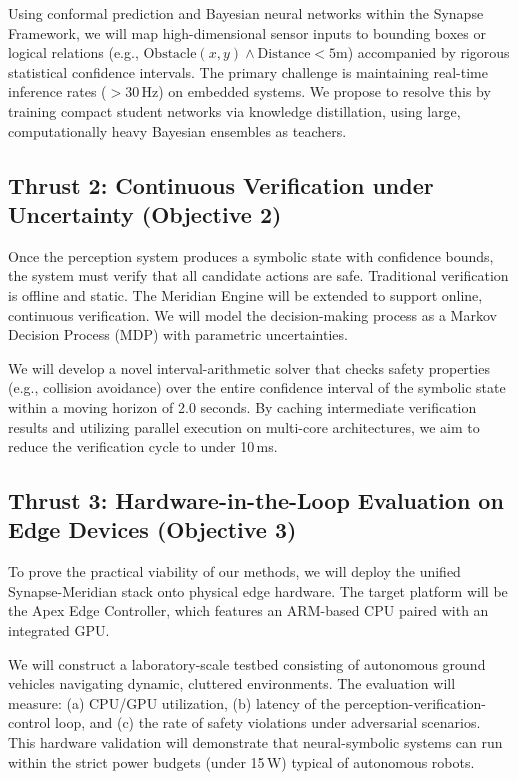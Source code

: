 \documentclass[12pt, letterpaper]{article}
\begin{document}
Using conformal prediction and Bayesian neural networks within the Synapse Framework, we will map high-dimensional sensor inputs to bounding boxes or logical relations (e.g., $\text{Obstacle}(x, y) \land \text{Distance} < 5\text{m}$) accompanied by rigorous statistical confidence intervals. The primary challenge is maintaining real-time inference rates ($>30$\,Hz) on embedded systems. We propose to resolve this by training compact student networks via knowledge distillation, using large, computationally heavy Bayesian ensembles as teachers.

\subsection{Thrust 2: Continuous Verification under Uncertainty (Objective 2)}
Once the perception system produces a symbolic state with confidence bounds, the system must verify that all candidate actions are safe. Traditional verification is offline and static. The Meridian Engine will be extended to support online, continuous verification. We will model the decision-making process as a Markov Decision Process (MDP) with parametric uncertainties. 

We will develop a novel interval-arithmetic solver that checks safety properties (e.g., collision avoidance) over the entire confidence interval of the symbolic state within a moving horizon of 2.0 seconds. By caching intermediate verification results and utilizing parallel execution on multi-core architectures, we aim to reduce the verification cycle to under 10\,ms.

\subsection{Thrust 3: Hardware-in-the-Loop Evaluation on Edge Devices (Objective 3)}
To prove the practical viability of our methods, we will deploy the unified Synapse-Meridian stack onto physical edge hardware. The target platform will be the Apex Edge Controller, which features an ARM-based CPU paired with an integrated GPU. 

We will construct a laboratory-scale testbed consisting of autonomous ground vehicles navigating dynamic, cluttered environments. The evaluation will measure: (a) CPU/GPU utilization, (b) latency of the perception-verification-control loop, and (c) the rate of safety violations under adversarial scenarios. This hardware validation will demonstrate that neural-symbolic systems can run within the strict power budgets (under 15\,W) typical of autonomous robots.
\end{document}
